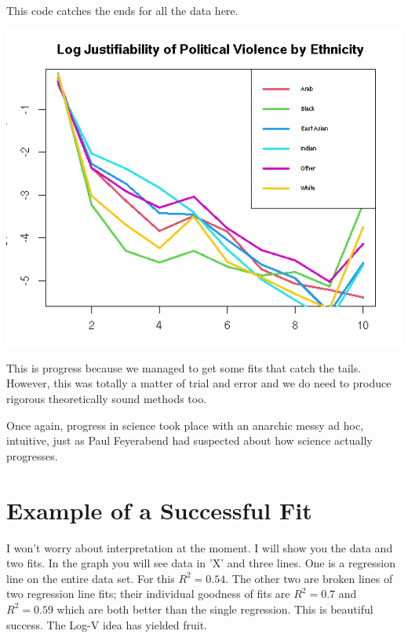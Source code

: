 \documentclass{amsart}
\begin{document}
This code catches the ends for all the data here.

\includegraphics[scale=0.8]{ethterror.jpeg}

This is progress because we managed to get some fits that catch the tails.  However, this was totally a matter of trial and error and we do need to produce rigorous theoretically sound methods too.

Once again, progress in science took place with an anarchic messy ad hoc, intuitive, just as Paul Feyerabend had suspected about how science actually progresses.

\section{Example of a Successful Fit}

I won't worry about interpretation at the moment.  I will show you the data and two fits.  In the graph you will see data in 'X' and three lines.  One is a regression line on the entire data set.  For this $R^2=0.54$.  The other two are broken lines of two regression line fits; their individual goodness of fits are $R^2=0.7$ and $R^2=0.59$ which are both better than the single regression.  This is beautiful success.  The Log-V idea has yielded fruit.
\end{document}
